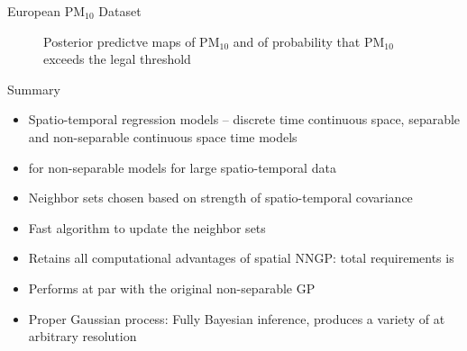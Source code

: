 \begin{frame}{European PM$_{10}$ Dataset}
\begin{figure}
\begin{center}
\end{center}
\caption{Posterior predictve maps of PM$_{10}$ and of probability that PM$_{10}$ exceeds the legal threshold}
\end{figure}
\end{frame}

\begin{frame}{Summary}
\begin{itemize}
\item Spatio-temporal regression models -- discrete time continuous space, separable and non-separable continuous space time models
\item {} for non-separable models for large spatio-temporal data
\item Neighbor sets chosen based on strength of spatio-temporal covariance
\item Fast algorithm to update the neighbor sets 
\item Retains all computational advantages of spatial NNGP: total requirements is 
\item Performs at par with the original non-separable GP
\item Proper Gaussian process: Fully Bayesian inference, produces a variety of  at arbitrary resolution
\end{itemize}
\end{frame}


